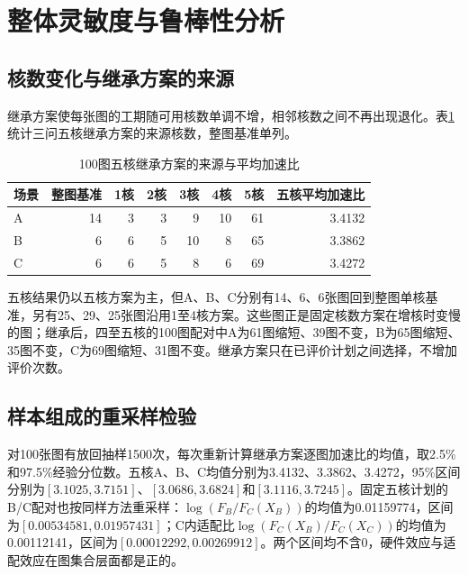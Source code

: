\section{整体灵敏度与鲁棒性分析}
\label{sec:overall-sensitivity}

\subsection{核数变化与继承方案的来源}
继承方案使每张图的工期随可用核数单调不增，相邻核数之间不再出现退化。表\ref{tab:best-core-choice}统计三问五核继承方案的来源核数，整图基准单列。
\begin{table}[H]\centering\small
\caption{100图五核继承方案的来源与平均加速比}\label{tab:best-core-choice}
\begin{tabular}{lrrrrrrr}\toprule
场景 & 整图基准 & 1核 & 2核 & 3核 & 4核 & 5核 & 五核平均加速比\\\midrule
A & 14 & 3 & 3 & 9 & 10 & 61 & 3.4132\\
B & 6 & 6 & 5 & 10 & 8 & 65 & 3.3862\\
C & 6 & 6 & 5 & 8 & 6 & 69 & 3.4272\\\bottomrule
\end{tabular}\end{table}

五核结果仍以五核方案为主，但A、B、C分别有14、6、6张图回到整图单核基准，另有25、29、25张图沿用1至4核方案。这些图正是固定核数方案在增核时变慢的图；继承后，四至五核的100图配对中A为61图缩短、39图不变，B为65图缩短、35图不变，C为69图缩短、31图不变。继承方案只在已评价计划之间选择，不增加评价次数。

\subsection{样本组成的重采样检验}
对100张图有放回抽样1500次，每次重新计算继承方案逐图加速比的均值，取2.5\%和97.5\%经验分位数。五核A、B、C均值分别为3.4132、3.3862、3.4272，95\%区间分别为$[3.1025,3.7151]$、$[3.0686,3.6824]$和$[3.1116,3.7245]$。固定五核计划的B/C配对也按同样方法重采样：$\log(F_B/F_C(X_B))$的均值为0.01159774，区间为$[0.00534581,0.01957431]$；C内适配比$\log(F_C(X_B)/F_C(X_C))$的均值为0.00112141，区间为$[0.00012292,0.00269912]$。两个区间均不含0，硬件效应与适配效应在图集合层面都是正的。

